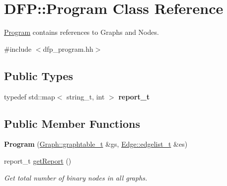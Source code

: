 \hypertarget{class_d_f_p_1_1_program}{}\section{D\+FP\+:\+:Program Class Reference}
\label{class_d_f_p_1_1_program}


\hyperlink{class_d_f_p_1_1_program}{Program} contains references to Graphs and Nodes.  




{\ttfamily \#include $<$dfp\+\_\+program.\+hh$>$}

\subsection*{Public Types}
\begin{DoxyCompactItemize}
\item 
typedef std\+::map$<$ string\+\_\+t, int $>$ {\bfseries report\+\_\+t}\hypertarget{class_d_f_p_1_1_program_aeaaa020ec93ac51b61399ba349e6ca64}{}\label{class_d_f_p_1_1_program_aeaaa020ec93ac51b61399ba349e6ca64}

\end{DoxyCompactItemize}
\subsection*{Public Member Functions}
\begin{DoxyCompactItemize}
\item 
{\bfseries Program} (\hyperlink{class_d_f_p_1_1_graph_ae35638adb932f3b7fd545ac09ea34c5a}{Graph\+::graphtable\+\_\+t} \&gs, \hyperlink{class_d_f_p_1_1_edge_a71ccd1900dbfda5591981064738f60af}{Edge\+::edgelist\+\_\+t} \&es)\hypertarget{class_d_f_p_1_1_program_a08995326789c0e0fdea41d36fc90584c}{}\label{class_d_f_p_1_1_program_a08995326789c0e0fdea41d36fc90584c}

\item 
report\+\_\+t \hyperlink{class_d_f_p_1_1_program_a0e2b0b5a6fd02902742c1728679872e9}{get\+Report} ()\hypertarget{class_d_f_p_1_1_program_a0e2b0b5a6fd02902742c1728679872e9}{}\label{class_d_f_p_1_1_program_a0e2b0b5a6fd02902742c1728679872e9}

\begin{DoxyCompactList}\small\item\em Get total number of binary nodes in all graphs. \end{DoxyCompactList}\end{DoxyCompactItemize}
